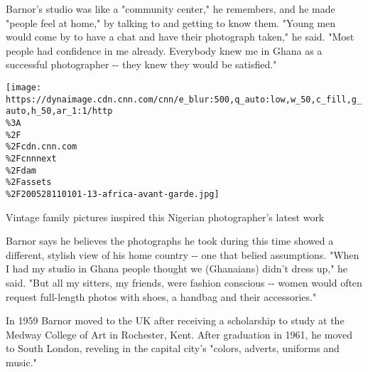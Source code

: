 Barnor's studio was like a "community center," he remembers, and he made
"people feel at home," by talking to and getting to know them. "Young
men would come by to have a chat and have their photograph taken," he
said. "Most people had confidence in me already. Everybody knew me in
Ghana as a successful photographer -\/- they knew they would be
satisfied."

\href{/style/article/a-ti-de-oye-diran-photography/index.html}{}

\texttt{[image: https://dynaimage.cdn.cnn.com/cnn/e\_blur:500,q\_auto:low,w\_50,c\_fill,g\_auto,h\_50,ar\_1:1/http\\\%3A\\\%2F\\\%2Fcdn.cnn.com\\\%2Fcnnnext\\\%2Fdam\\\%2Fassets\\\%2F200528110101-13-africa-avant-garde.jpg]}

Vintage family pictures inspired this Nigerian photographer's latest
work

Barnor says he believes the photographs he took during this time showed
a different, stylish view of his home country -\/- one that belied
assumptions. "When I had my studio in Ghana people thought we
(Ghanaians) didn't dress up," he said. "But all my sitters, my friends,
were fashion conscious -\/- women would often request full-length photos
with shoes, a handbag and their accessories."

In 1959 Barnor moved to the UK after receiving a scholarship to study at
the Medway College of Art in Rochester, Kent. After graduation in 1961,
he moved to South London, reveling in the capital city's "colors,
adverts, uniforms and music."

